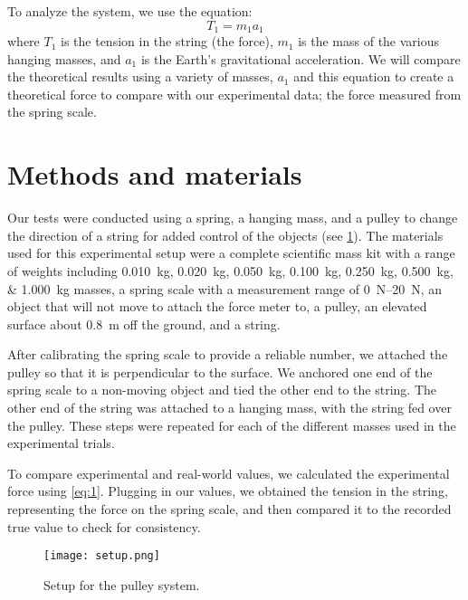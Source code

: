 \documentclass[reprint,amsmath,amssymb,aps,twoside]{revtex4-2}
\begin{document}
To analyze the system, we use the equation:
\begin{equation}
T_1 = m_1 a_1
\label{eq:1}
\end{equation}
where $T_1$ is the tension in the string (the force), $m_1$ is the mass of the various hanging masses, and $a_1$ is the Earth's gravitational acceleration. We will compare the theoretical results using a variety of masses, $a_1$ and this equation to create a theoretical force to compare with our experimental data; the force measured from the spring scale.




    
\section{Methods and materials}
Our tests were conducted using a spring, a hanging mass, and a pulley to change the direction of a string for added control of the objects (see \cref{fig:setup}). The materials used for this experimental setup were a complete scientific mass kit with a range of weights including \qtylist{0.010;0.020;0.050;0.100;0.250;0.500;1.000}{\kilo\gram} masses, a spring scale with a measurement range of \qtyrange{0}{20}{\newton}, an object that will not move to attach the force meter to, a pulley, an elevated surface about \qty{0.8}{\meter} off the ground, and a string.
        
After calibrating the spring scale to provide a reliable number, we attached the pulley so that it is perpendicular to the surface. We anchored one end of the spring scale to a non-moving object and tied the other end to the string. The other end of the string was attached to a hanging mass, with the string fed over the pulley. These steps were repeated for each of the different masses used in the experimental trials.
        
To compare experimental and real-world values, we calculated the experimental force using \cref{eq:1}. Plugging in our values, we obtained the tension in the string, representing the force on the spring scale, and then compared it to the recorded true value to check for consistency. 
\begin{figure}
\begin{center}
\texttt{[image: setup.png]}
\end{center}
\caption{\label{fig:setup} Setup for the pulley system.}
\end{figure}
        
\end{document}
